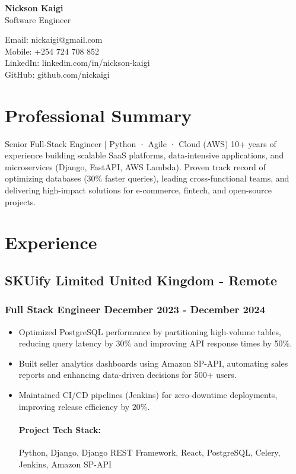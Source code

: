 \documentclass[11pt]{article} %
\begin{document}
\begin{center}
    \begin{minipage}{0.5\textwidth}
    {\Huge\bfseries
        Nickson Kaigi
        } \\ \medskip
        Software Engineer
    \end{minipage} \hfill
    \begin{minipage}{0.4\textwidth}
        \raggedleft
        Email: nickaigi@gmail.com \\
        Mobile: +254 724 708 852 \\
        LinkedIn: linkedin.com/in/nickson-kaigi \\
        GitHub: github.com/nickaigi
    \end{minipage}
\end{center}

\section{Professional Summary}
Senior Full-Stack Engineer | Python · Agile · Cloud (AWS)
10+ years of experience building scalable SaaS platforms, data-intensive applications, and microservices (Django, FastAPI, AWS Lambda). Proven track record of optimizing databases (30\% faster queries), leading cross-functional teams, and delivering high-impact solutions for e-commerce, fintech, and open-source projects.

\section{Experience}
\subsection{SKUify Limited \hfill United Kingdom - Remote}
\subsubsection{Full Stack Engineer \hfill  December 2023 - December 2024}
\begin{itemize}
    \item Optimized PostgreSQL performance by partitioning high-volume tables, reducing query latency by 30\% and improving API response times by 50\%.
    \item Built seller analytics dashboards using Amazon SP-API, automating sales reports and enhancing data-driven decisions for 500+ users.
    \item Maintained CI/CD pipelines (Jenkins) for zero-downtime deployments, improving release efficiency by 20\%.

    \paragraph{Project Tech Stack:} Python, Django, Django REST Framework, React, PostgreSQL, Celery, Jenkins, Amazon SP-API
\end{itemize}
\end{document}
